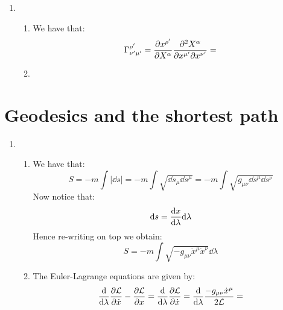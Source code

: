 \documentclass[10pt,a4paper]{book}
\begin{document}
\begin{enumerate}
\begin{enumerate}
\end{enumerate}

\item \begin{enumerate}

\item We have that:
\[
\Gamma^{\rho'}_{\nu' \mu'} = \pdv{x^{\rho'}}{X^\alpha} \pdv[2]{X^\alpha}{x^{\mu'}}{x^{\nu'}} = 
\]

\item 

\end{enumerate}

\end{enumerate}

\section{Geodesics and the shortest path}
\begin{enumerate}

\item \begin{enumerate}

\item We have that:
\[
S = - m \int | \dd s | = - m \int \sqrt{ \dd s_\mu \dd s^\mu }  = - m \int \sqrt{ g_{\mu \nu} \dd s^\mu \dd s^\nu }
\]
Now notice that:
\[
\dd s = \dv{x}{\lambda} \dd \lambda
\]
Hence re-writing on top we obtain:
\[
S = - m \int \sqrt{ - g_{\mu \nu} \dot{x}^\mu \dot{x}^\nu } \dd \lambda
\]

\item The Euler-Lagrange equations are given by:
\[
\dv{}{\lambda} \pdv{\mathcal{L}}{\dot{x}} - \pdv{\mathcal{L}}{x} = \dv{}{\lambda} \pdv{\mathcal{L}}{\dot{x}} = \dv{}{\lambda} \frac{-g_{\mu \nu} \dot{x}^\mu}{2 \mathcal{L}} = 
\]

\end{enumerate}



\end{enumerate}
\end{document}
